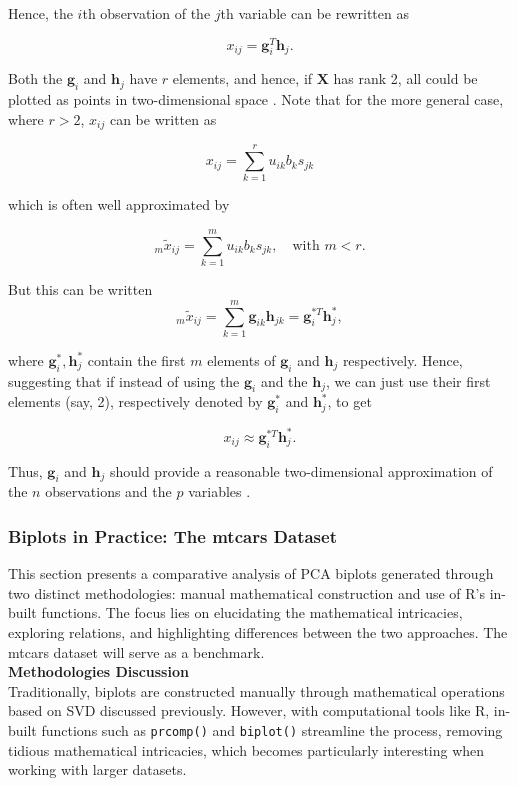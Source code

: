 \documentclass{article}\usepackage[]{graphicx}\usepackage[]{xcolor}
\numberwithin{equation}{section}
\begin{document}
\noindent Hence, the $i$th observation of the $j$th variable can be rewritten as

\[ x_{ij} = \mathbf{g}_i^T \mathbf{h}_j. \]

\noindent Both the $\mathbf{g}_i$ and $\mathbf{h}_j$ have $r$ elements, and hence, if $\mathbf{X}$ has rank 2, all could be plotted as points in two-dimensional space \cite{biplotsnotes}. Note that for the more general case, where $r > 2$, $x_{ij}$ can be written as

\[
x_{ij} = \sum_{k=1}^{r} u_{ik}b_{k}s_{jk}
\]

\noindent which is often well approximated by

\[
_m\tilde{x}_{ij} = \sum_{k=1}^{m} u_{ik}b_{k}s_{jk}, \quad \text{with } m < r.
\]

\noindent But this can be written
\[
_m\tilde{x}_{ij} = \sum_{k=1}^{m} \mathbf{g}_{ik}\mathbf{h}_{jk} = \mathbf{g}_{i}^{*T}\mathbf{h}_{j}^{*},
\]

\noindent where $\mathbf{g}^*_{i}, \mathbf{h}^*_{j}$ contain the first $m$ elements of $\mathbf{g}_i$ and $\mathbf{h}_j$ respectively. Hence, suggesting that if instead of using the $\mathbf{g}_i$ and the $\mathbf{h}_j$, we can just use their first elements (say, 2), respectively denoted by  $\mathbf{g}_{i}^{*}$  and  $\mathbf{h}_{j}^{*}$, to get

\[ x_{ij} \approx \mathbf{g}_{i}^{*T}\mathbf{h}_{j}^{*}.\]

\noindent Thus, $\mathbf{g}_i$ and $\mathbf{h}_j$ should provide a reasonable two-dimensional approximation of the $n$ observations and the $p$ variables \cite{jolliffe2003principal}.\\

\subsubsection{Biplots in Practice: The mtcars Dataset}

\noindent This section presents a comparative analysis of PCA biplots generated through two distinct methodologies: manual mathematical construction and use of R's in-built functions. The focus lies on elucidating the mathematical intricacies, exploring relations, and highlighting differences between the two approaches. The mtcars dataset will serve as a benchmark.\\

\noindent \textbf{Methodologies Discussion}\\
\noindent Traditionally, biplots are constructed manually through mathematical operations based on SVD discussed previously. However, with computational tools like R, in-built functions such as \texttt{prcomp()} and \texttt{biplot()} streamline the process, removing tidious mathematical intricacies, which becomes particularly interesting when working with larger datasets.\\
\end{document}
